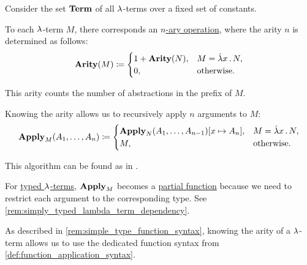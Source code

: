 \begin{algorithm}\label{alg:untyped_lambda_term_to_function}
  Consider the set \hyperref[def:lambda_term/term]{\( \op*{Term} \)} of all \( {\mathrm \lambda} \)-terms over a fixed set of constants.

  To each \( {\mathrm \lambda} \)-term \( M \), there corresponds an \hyperref[def:operation_on_set]{\( n \)-ary operation}, where the arity \( n \) is determined as follows:
  \begin{equation}\label{eq:alg:untyped_lambda_term_to_function/arity}
    \op*{Arity}(M) \coloneqq \begin{cases}
      1 + \op*{Arity}(N), &M = \qabs x N, \\
      0,                  &\T{otherwise.}
    \end{cases}
  \end{equation}

  This arity counts the number of abstractions in the prefix of \( M \).

  Knowing the arity allows us to recursively apply \( n \) arguments to \( M \):
  \begin{equation}\label{eq:alg:untyped_lambda_term_to_function/apply}
    \op*{Apply}_M(A_1, \ldots, A_n) \coloneqq \begin{cases}
      \op*{Apply}_N(A_1, \ldots, A_{n-1})[x \mapsto A_n], &M = \qabs x N, \\
      M,                                                   &\T{otherwise.}
    \end{cases}
  \end{equation}
\end{algorithm}
\begin{comments}
  \item This algorithm can be found as  in \cite{notebook:code}.

  \item For \hyperref[def:typed_lambda_term]{typed \( {\mathrm \lambda} \)-terms}, \( \op*{Apply}_M \) becomes a \hyperref[def:set_valued_map/partial]{partial function} because we need to restrict each argument to the corresponding type. See \cref{rem:simply_typed_lambda_term_dependency}.

  \item As described in \cref{rem:simple_type_function_syntax}, knowing the arity of a \( {\mathrm \lambda} \)-term allows us to use the dedicated function syntax from \cref{def:function_application_syntax}.
\end{comments}

